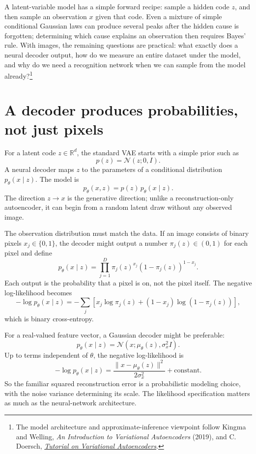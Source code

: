
A latent-variable model has a simple forward recipe: sample a hidden code \(z\), and then sample an observation \(x\) given that code. Even a mixture of simple conditional Gaussian laws can produce several peaks after the hidden cause is forgotten; determining which cause explains an observation then requires Bayes' rule. With images, the remaining questions are practical: what exactly does a neural decoder output, how do we measure an entire dataset under the model, and why do we need a recognition network when we can sample from the model already?\footnote{The model architecture and approximate-inference viewpoint follow Kingma and Welling, \emph{An Introduction to Variational Autoencoders} (2019), and C. Doersch, \href{https://arxiv.org/abs/1606.05908}{\emph{Tutorial on Variational Autoencoders}}.}

\section{A decoder produces probabilities, not just pixels}

For a latent code \(z\in\mathbb R^d\), the standard VAE starts with a simple prior such as
\[
 p(z)=\mathcal N(z;0,I).
\]
A neural decoder maps \(z\) to the parameters of a conditional distribution \(p_\theta(x\mid z)\). The model is
\[
 \boxed{p_\theta(x,z)=p(z)\,p_\theta(x\mid z).}
\]
The direction \(z\to x\) is the generative direction; unlike a reconstruction-only autoencoder, it can begin from a random latent draw without any observed image.

The observation distribution must match the data. If an image consists of binary pixels \(x_j\in\{0,1\}\), the decoder might output a number \(\pi_j(z)\in(0,1)\) for each pixel and define
\[
 p_\theta(x\mid z)
 =\prod_{j=1}^D
 \pi_j(z)^{x_j}(1-\pi_j(z))^{1-x_j}.
\]
Each output is the probability that a pixel is on, not the pixel itself. The negative log-likelihood becomes
\[
 -\log p_\theta(x\mid z)
 =-\sum_j[x_j\log\pi_j(z)+(1-x_j)\log(1-\pi_j(z))],
\]
which is binary cross-entropy.

For a real-valued feature vector, a Gaussian decoder might be preferable:
\[
 p_\theta(x\mid z)=
 \mathcal N(x;\mu_\theta(z),\sigma_x^2I).
\]
Up to terms independent of \(\theta\), the negative log-likelihood is
\[
 -\log p_\theta(x\mid z)
 =\frac{\|x-\mu_\theta(z)\|^2}{2\sigma_x^2}
   +\text{constant}.
\]
So the familiar squared reconstruction error is a probabilistic modeling choice, with the noise variance determining its scale. The likelihood specification matters as much as the neural-network architecture.

